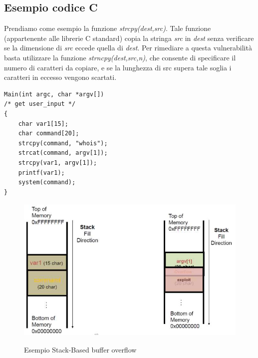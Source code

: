 \subsection{Esempio codice C}
Prendiamo come esempio la funzione \textit{strcpy(dest,src)}. Tale funzione (appartenente alle librerie C standard) copia la stringa \textit{src} in \textit{dest} senza verificare se la dimensione di \textit{src} eccede quella di \textit{dest}. Per rimediare a questa vulnerabilità basta utilizzare la funzione \textit{strncpy(dest,src,n)}, che consente di specificare il numero di caratteri da copiare, e se la lunghezza di src supera tale soglia i caratteri in eccesso vengono scartati.
\begin{algorithm}
\begin{lstlisting}[caption={Esempio codice vulnerabile al buffer overflow in C}]
Main(int argc, char *argv[])
/* get user_input */
{
	char var1[15];
	char command[20];
	strcpy(command, "whois");
	strcat(command, argv[1]);
	strcpy(var1, argv[1]);
	printf(var1);
	system(command);
}
\end{lstlisting}
\end{algorithm}
\begin{figure}[htbp]
	\centering%
	\subfigure%
	{\includegraphics[height=7cm, width=13cm, keepaspectratio]{Immagini/sistemi_operativi/esempio_stack_2.png}}
	\caption{Esempio Stack-Based buffer overflow\label{fig:esempio_stack}} 	
\end{figure}

